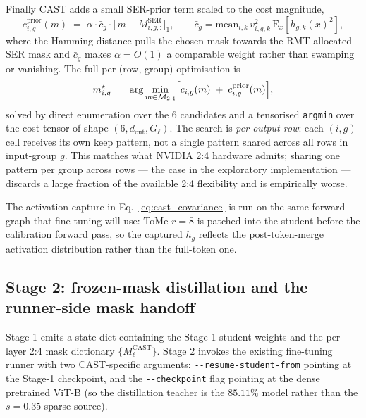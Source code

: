 \documentclass[11pt]{article}
\theoremstyle{plain}
\theoremstyle{definition}
\theoremstyle{remark}
\newcommand{\1}{\mathbf{1}}
\begin{document}
Finally CAST adds a small SER-prior term scaled to the cost magnitude,
\begin{equation}
\label{eq:cast_prior}
c^{\mathrm{prior}}_{i,g}(m) \;=\; \alpha\cdot \bar c_g \cdot \bigl|\,m - M^{\mathrm{SER}}_{i,g,:}\bigr|_1,
\qquad
\bar c_g = \mathrm{mean}_{i,k}\, v_{i,g,k}^2\,\mathrm E_x[h_{g,k}(x)^2],
\end{equation}
where the Hamming distance pulls the chosen mask towards the RMT-allocated SER mask and \(\bar c_g\) makes \(\alpha=O(1)\) a comparable weight rather than swamping or vanishing.  The full per-(row, group) optimisation is
\begin{equation}
\label{eq:cast_argmin}
m^\star_{i,g}\;=\;\arg\min_{m\in\mathcal M_{2:4}}\Bigl[c_{i,g}(m)\;+\;c^{\mathrm{prior}}_{i,g}(m)\Bigr],
\end{equation}
solved by direct enumeration over the 6 candidates and a tensorised \texttt{argmin} over the cost tensor of shape \((6,d_{\mathrm{out}},G_\ell)\).  The search is \emph{per output row}: each \((i,g)\) cell receives its own keep pattern, not a single pattern shared across all rows in input-group \(g\).  This matches what NVIDIA 2:4 hardware admits; sharing one pattern per group across rows --- the case in the exploratory implementation --- discards a large fraction of the available 2:4 flexibility and is empirically worse.

The activation capture in Eq.~\eqref{eq:cast_covariance} is run on the same forward graph that fine-tuning will use: ToMe \(r=8\) is patched into the student before the calibration forward pass, so the captured \(h_g\) reflects the post-token-merge activation distribution rather than the full-token one.

\subsection{Stage 2: frozen-mask distillation and the runner-side mask handoff}
\label{subsec:cast_stage2_meth}

Stage 1 emits a state dict containing the Stage-1 student weights and the per-layer 2:4 mask dictionary \(\{M^{\mathrm{CAST}}_\ell\}\).  Stage 2 invokes the existing fine-tuning runner with two CAST-specific arguments: \texttt{-{}-resume-student-from} pointing at the Stage-1 checkpoint, and the \texttt{-{}-checkpoint} flag pointing at the dense pretrained ViT-B (so the distillation teacher is the \(85.11\%\) model rather than the \(s=0.35\) sparse source).
\end{document}
